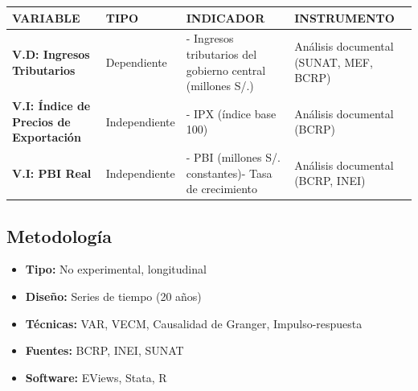 \documentclass[
  man,
  floatsintext,
  longtable,
  a4paper,
  nolmodern,
  notxfonts,
  notimes,
  12pt,
  colorlinks=true,linkcolor=blue,citecolor=blue,urlcolor=blue]{apa7}
\providecommand{\tightlist}{%
  \setlength{\itemsep}{0pt}\setlength{\parskip}{0pt}}
\newcounter{none} %
\begin{document}
{\def\LTcaptype{none} %
\begin{longtable}[]{@{}
  >{\raggedright\arraybackslash}p{}
  >{\raggedright\arraybackslash}p{}
  >{\raggedright\arraybackslash}p{}
  >{\raggedright\arraybackslash}p{}@{}}
\toprule\noalign{}
\begin{minipage}[b]{\linewidth}\raggedright
VARIABLE
\end{minipage} & \begin{minipage}[b]{\linewidth}\raggedright
TIPO
\end{minipage} & \begin{minipage}[b]{\linewidth}\raggedright
INDICADOR
\end{minipage} & \begin{minipage}[b]{\linewidth}\raggedright
INSTRUMENTO
\end{minipage} \\
\midrule\noalign{}
\endhead
\bottomrule\noalign{}
\endlastfoot
\textbf{V.D: Ingresos Tributarios} & Dependiente & - Ingresos
tributarios del gobierno central (millones S/.) & Análisis documental
(SUNAT, MEF, BCRP) \\
\textbf{V.I: Índice de Precios de Exportación} & Independiente & - IPX
(índice base 100) & Análisis documental (BCRP) \\
\textbf{V.I: PBI Real} & Independiente & - PBI (millones S/.
constantes)- Tasa de crecimiento & Análisis documental (BCRP, INEI) \\
\end{longtable}
}

\subsection{Metodología}\label{metodologuxeda-12}

\begin{itemize}
\tightlist
\item
  \textbf{Tipo:} No experimental, longitudinal
\item
  \textbf{Diseño:} Series de tiempo (20 años)
\item
  \textbf{Técnicas:} VAR, VECM, Causalidad de Granger, Impulso-respuesta
\item
  \textbf{Fuentes:} BCRP, INEI, SUNAT
\item
  \textbf{Software:} EViews, Stata, R
\end{itemize}
\end{document}
